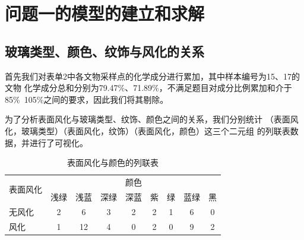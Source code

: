 \documentclass[withoutpreface,bwprint]{cumcmthesis}
\begin{document}

\section{问题一的模型的建立和求解}
\subsection{玻璃类型、颜色、纹饰与风化的关系}
首先我们对表单2中各文物采样点的化学成分进行累加，其中样本编号为15、17的文物
化学成分总和分别为79.47\%、71.89\%，不满足题目对成分比例累加和介于 
85\%~105\%之间的要求，因此我们将其剔除。

为了分析表面风化与玻璃类型、纹饰、颜色之间的关系，我们分别统计
（表面风化，玻璃类型）（表面风化，纹饰）（表面风化，颜色）这三个二元组
的列联表数据，并进行了可视化。

\begin{table}[htbp]
    \centering
    \caption{表面风化与颜色的列联表}
    \begin{tabular}{lcccccccc}
        \toprule
        \multirow{2}{*}{表面风化} & \multicolumn{8}{c}{颜色} \\
        \cmidrule(lr){2-9}
        & 浅绿 & 浅蓝 & 深绿 & 深蓝 & 紫 & 绿 & 蓝绿 & 黑 \\
        \midrule
        无风化 & 2 & 6 & 3 & 2 & 2 & 1 & 6 & 0 \\
        风化 & 1 & 12 & 4 & 0 & 2 & 0 & 9 & 2 \\
        \bottomrule
    \end{tabular}
\end{table}
\end{document}
